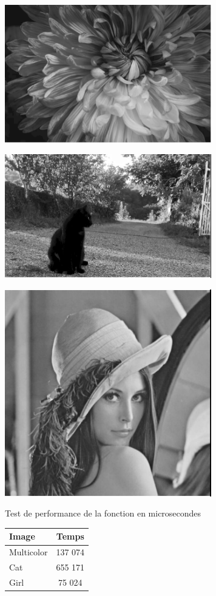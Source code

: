 \documentclass{article}
\begin{document}
\begin{center} 
    \includegraphics[width=9cm]{../Image_fonctions/Multicolor/Gray.PNG}
\end{center}
\begin{center} 
    \includegraphics[width=9cm]{../Image_fonctions/Cat/Gray.PNG}
\end{center}
\begin{center} 
    \includegraphics[width=9cm]{../Image_fonctions/Lenna/Gray.PNG}
\end{center}

\begin{center}
\medbreak
Test de performance de la fonction en microsecondes
\bigbreak
   \begin{tabular}{ | l | c | }
     \hline
     Image & Temps \\
     \hline
     Multicolor & 137 074 \\
     \hline
     Cat & 655 171 \\
     \hline
     Girl & 75 024 \\
     \hline
   \end{tabular}
 \end{center}
 \bigbreak
\end{document}

